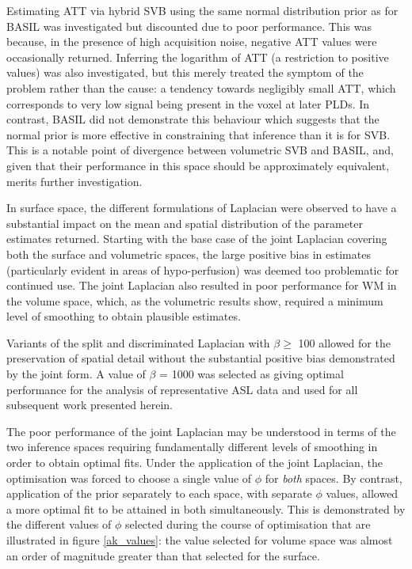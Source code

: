 Estimating ATT via hybrid SVB using the same normal distribution prior as for BASIL was investigated but discounted due to poor performance. This was because, in the presence of high acquisition noise, negative ATT values were occasionally returned. Inferring the logarithm of ATT (a restriction to positive values) was also investigated, but this merely treated the symptom of the problem rather than the cause: a tendency towards negligibly small ATT, which corresponds to very low signal being present in the voxel at later PLDs. In contrast, BASIL did not demonstrate this behaviour which suggests that the normal prior is more effective in constraining that inference than it is for SVB. This is a notable point of divergence between volumetric SVB and BASIL, and, given that their performance in this space should be approximately equivalent, merits further investigation. 

In surface space, the different formulations of Laplacian were observed to have a substantial impact on the mean and spatial distribution of the parameter estimates returned. Starting with the base case of the joint Laplacian covering both the surface and volumetric spaces, the large positive bias in estimates (particularly evident in areas of hypo-perfusion) was deemed too problematic for continued use. The joint Laplacian also resulted in poor performance for WM in the volume space, which, as the volumetric results show, required a minimum level of smoothing to obtain plausible estimates. 

Variants of the split and discriminated Laplacian with $\beta \geq$ 100 allowed for the preservation of spatial detail without the substantial positive bias demonstrated by the joint form. A value of $\beta$ = 1000 was selected as giving optimal performance for the analysis of representative ASL data and used for all subsequent work presented herein. 

The poor performance of the joint Laplacian may be understood in terms of the two inference spaces requiring fundamentally different levels of smoothing in order to obtain optimal fits. Under the application of the joint Laplacian, the optimisation was forced to choose a single value of $\phi$ for \textit{both} spaces. By contrast, application of the prior separately to each space, with separate $\phi$ values, allowed a more optimal fit to be attained in both simultaneously. This is demonstrated by the different values of $\phi$ selected during the course of optimisation that are illustrated in figure \ref{ak_values}: the value selected for volume space was almost an order of magnitude greater than that selected for the surface. 

